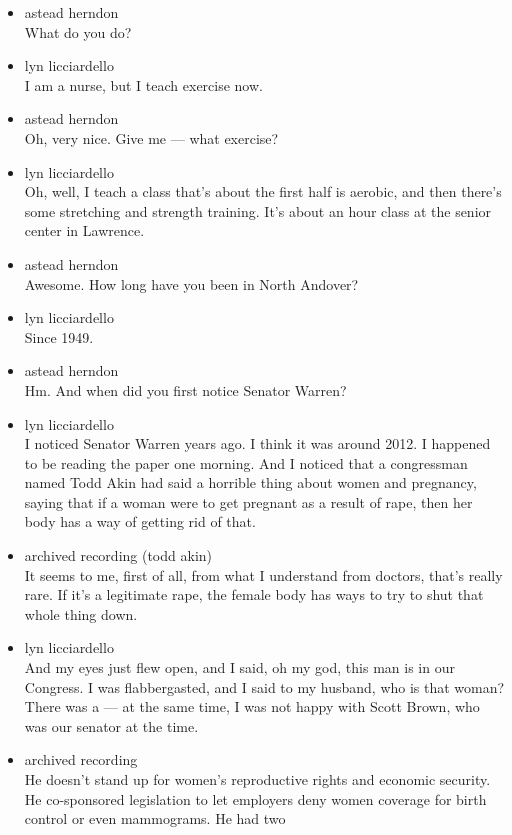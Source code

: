 \begin{itemize}
\item
  astead herndon\\
  What do you do?
\item
  lyn licciardello\\
  I am a nurse, but I teach exercise now.
\item
  astead herndon\\
  Oh, very nice. Give me --- what exercise?
\item
  lyn licciardello\\
  Oh, well, I teach a class that's about the first half is aerobic, and
  then there's some stretching and strength training. It's about an hour
  class at the senior center in Lawrence.
\item
  astead herndon\\
  Awesome. How long have you been in North Andover?
\item
  lyn licciardello\\
  Since 1949.
\item
  astead herndon\\
  Hm. And when did you first notice Senator Warren?
\item
  lyn licciardello\\
  I noticed Senator Warren years ago. I think it was around 2012. I
  happened to be reading the paper one morning. And I noticed that a
  congressman named Todd Akin had said a horrible thing about women and
  pregnancy, saying that if a woman were to get pregnant as a result of
  rape, then her body has a way of getting rid of that.
\item
  archived recording (todd akin)\\
  It seems to me, first of all, from what I understand from doctors,
  that's really rare. If it's a legitimate rape, the female body has
  ways to try to shut that whole thing down.
\item
  lyn licciardello\\
  And my eyes just flew open, and I said, oh my god, this man is in our
  Congress. I was flabbergasted, and I said to my husband, who is that
  woman? There was a --- at the same time, I was not happy with Scott
  Brown, who was our senator at the time.
\item
  archived recording\\
  He doesn't stand up for women's reproductive rights and economic
  security. He co-sponsored legislation to let employers deny women
  coverage for birth control or even mammograms. He had two

\end{itemize}
